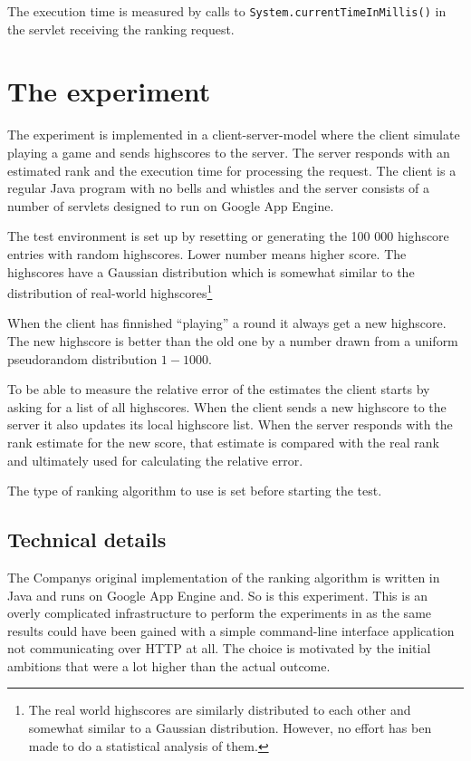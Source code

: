 The execution time is measured by calls to \texttt{System.currentTimeInMillis()} in the servlet receiving the ranking request.

\section{The experiment}

The experiment is implemented in a client-server-model where the client simulate playing a game and sends highscores to the server. The server responds with an estimated rank and the execution time for processing the request. The client is a regular Java program with no bells and whistles and the server consists of a number of servlets designed to run on Google App Engine. 

The test environment is set up by resetting or generating the 100 000 highscore entries with random highscores. Lower number means higher score. The highscores have a Gaussian distribution which is somewhat similar to the distribution of real-world highscores\footnote{The real world highscores are similarly distributed to each other and somewhat similar to a Gaussian distribution. However, no effort has ben made to do a statistical analysis of them.}


When the client has finnished ``playing'' a round it always get a new highscore. The new highscore is better than the old one by a number drawn from a uniform pseudorandom distribution $1-1000$.

To be able to measure the relative error of the estimates the client starts by asking for a list of all highscores. When the client sends a new highscore to the server it also updates its local highscore list. When the server responds with the rank estimate for the new score, that estimate is compared with the real rank and ultimately used for calculating the relative error.

The type of ranking algorithm to use is set before starting the test.

\subsection{Technical details}

The Companys original implementation of the ranking algorithm is written in Java and runs on Google App Engine and. So is this experiment. This is an overly complicated infrastructure to perform the experiments in as the same results could have been gained with a simple command-line interface application not communicating over HTTP at all. The choice is motivated by the initial ambitions that were a lot higher than the actual outcome.

